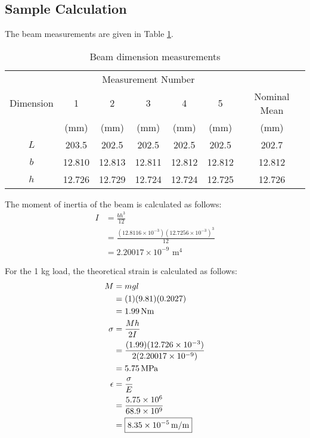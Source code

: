 \subsection{Sample Calculation}
The beam measurements are given in Table \ref{tab:Q2BeamMeasurements}.
\begin{table}[h]
    \centering
    \caption{Beam dimension measurements}
    \label{tab:Q2BeamMeasurements}
    \begin{tabular}{ccccccc}
        \toprule
        & \multicolumn{5}{c}{Measurement Number} & \\
        \cmidrule{2-6} 
        Dimension & 1 & 2 & 3 & 4 & 5 & Nominal Mean \\
        & (mm) & (mm) & (mm) & (mm) & (mm) & (mm) \\
        \midrule
        $L$ & 203.5 & 202.5 & 202.5 & 202.5 & 202.5 & 202.7 \\
        $b$ & 12.810 & 12.813 & 12.811 & 12.812 & 12.812 & 12.812 \\
        $h$ & 12.726 & 12.729 & 12.724 & 12.724 & 12.725 & 12.726 \\
        \bottomrule
    \end{tabular}
\end{table}

The moment of inertia of the beam is calculated as follows:
\begin{align*}
    I &= \frac{bh^3}{12} \\
    &= \frac{(12.8116 \times 10^{-3})(12.7256 \times 10^{-3})^3}{12} \\
    &= 2.20017 \times 10^{-9} \text{ m}^4
\end{align*}

For the 1 kg load, the theoretical strain is calculated as follows:
\begin{align*}
    M & = mgl \\
    & = (1)(9.81)(0.2027) \\
    & = \qty{1.99}{Nm} \\
    \sigma & = \frac{M h}{2I} \\
    & = \frac{(1.99)(12.726 \times 10^{-3})}{2(2.20017 \times 10^{-9})} \\
    & = \qty{5.75}{MPa} \\
    \epsilon & = \frac{\sigma}{E} \\
    & = \frac{5.75 \times 10^6}{68.9 \times 10^9} \\
    & = \boxed{\qty{8.35 E-05}{m/m}}
\end{align*}







